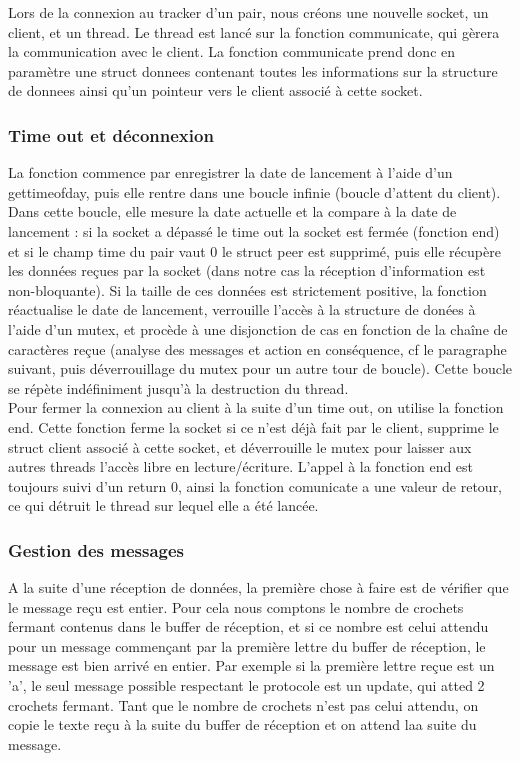 Lors de la connexion au tracker d'un pair, nous créons une nouvelle socket, un client, et un thread. Le thread est lancé sur la fonction communicate, qui gèrera la communication avec le client. La fonction communicate prend donc en paramètre une struct donnees contenant toutes les informations sur la structure de donnees ainsi qu'un pointeur vers le client associé à cette socket.

\subsubsection{Time out et déconnexion}
La fonction commence par enregistrer la date de lancement à l'aide d'un gettimeofday, puis elle rentre dans une boucle infinie (boucle d'attent du client). Dans cette boucle, elle mesure la date actuelle et la compare à la date de lancement : si la socket a dépassé le time out la socket est fermée (fonction end) et si le champ time du pair vaut 0 le struct peer est supprimé, puis elle récupère les données reçues par la socket (dans notre cas la réception d'information est non-bloquante). Si la taille de ces données est strictement positive, la fonction réactualise le date de lancement, verrouille l'accès à la structure de donées à l'aide d'un mutex, et procède à une disjonction de cas en fonction de la chaîne de caractères reçue (analyse des messages et action en conséquence, cf le paragraphe suivant, puis déverrouillage du mutex pour un autre tour de boucle). Cette boucle se répète indéfiniment jusqu'à la destruction du thread.\\

Pour fermer la connexion au client à la suite d'un time out, on utilise la fonction end. Cette fonction ferme la socket si ce n'est déjà fait par le client, supprime le struct client associé à cette socket, et déverrouille le mutex pour laisser aux autres threads l'accès libre en lecture/écriture. L'appel à la fonction end est toujours suivi d'un return 0, ainsi la fonction comunicate a une valeur de retour, ce qui détruit le thread sur lequel elle a été lancée.

\subsubsection{Gestion des messages}

A la suite d'une réception de données, la première chose à faire est de vérifier que le message reçu est entier. Pour cela nous comptons le nombre de crochets fermant contenus dans le buffer de réception, et si ce nombre est celui attendu pour un message commençant par la première lettre du buffer de réception, le message est bien arrivé en entier. Par exemple si la première lettre reçue est un 'a', le seul message possible respectant le protocole est un update, qui atted 2 crochets fermant. Tant que le nombre de crochets n'est pas celui attendu, on copie le texte reçu à la suite du buffer de réception et on attend laa suite du message.\\

